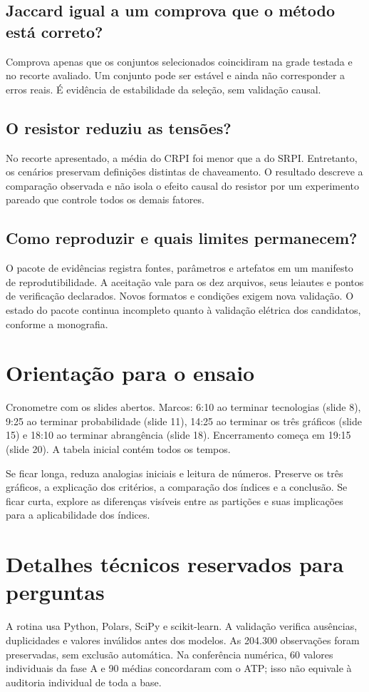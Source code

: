 \documentclass[11pt,a4paper]{article}
\begin{document}
\subsection*{Jaccard igual a um comprova que o método está correto?}
Comprova apenas que os conjuntos selecionados coincidiram na grade
testada e no recorte avaliado. Um conjunto pode ser estável e ainda
não corresponder a erros reais. É evidência de estabilidade da seleção,
sem validação causal.

\subsection*{O resistor reduziu as tensões?}
No recorte apresentado, a média do CRPI foi menor que a do SRPI.
Entretanto, os cenários preservam definições distintas de chaveamento.
O resultado descreve a comparação observada e não isola o efeito causal
do resistor por um experimento pareado que controle todos os demais fatores.

\subsection*{Como reproduzir e quais limites permanecem?}
O pacote de evidências registra fontes, parâmetros e artefatos em um manifesto de
reprodutibilidade. A aceitação vale para os dez arquivos, seus leiautes
e pontos de verificação declarados. Novos formatos e condições exigem
nova validação. O estado do pacote continua incompleto quanto à
validação elétrica dos candidatos, conforme a monografia.

\section*{Orientação para o ensaio}
Cronometre com os slides abertos. Marcos: 6:10 ao terminar tecnologias (slide 8), 9:25 ao terminar probabilidade (slide 11), 14:25 ao terminar os três gráficos (slide 15) e 18:10 ao terminar abrangência (slide 18). Encerramento começa em 19:15 (slide 20). A tabela inicial contém todos os tempos.

Se ficar longa, reduza analogias iniciais e leitura de números. Preserve os três gráficos, a explicação dos critérios, a comparação dos índices e a conclusão. Se ficar curta, explore as diferenças visíveis entre as partições e suas implicações para a aplicabilidade dos índices.

\section*{Detalhes técnicos reservados para perguntas}
A rotina usa Python, Polars, SciPy e scikit-learn. A validação verifica
ausências, duplicidades e valores inválidos antes dos modelos.
As 204.300 observações foram preservadas, sem exclusão automática.
Na conferência numérica, 60 valores individuais da fase A e 90 médias
concordaram com o ATP; isso não equivale à auditoria individual de toda
a base.
\end{document}
